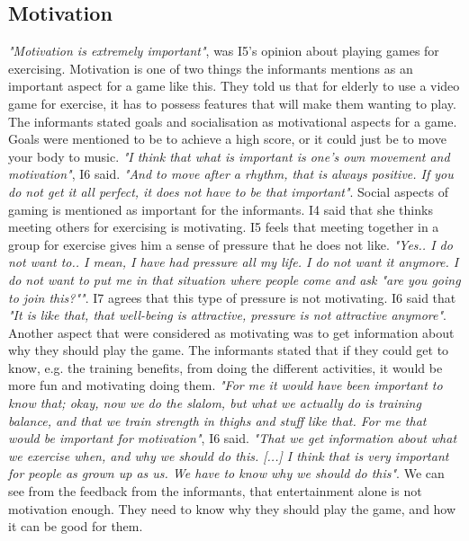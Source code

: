 \subsection{Motivation}
\emph{"Motivation is extremely important"}, was I5's opinion about playing games for exercising. Motivation is one of two things the informants mentions as an important aspect for a game like this. They told us that for elderly to use a video game for exercise, it has to possess features that will make them wanting to play. The informants stated goals and socialisation as motivational aspects for a game. Goals were mentioned to be to achieve a high score, or it could just be to move your body to music. \emph{"I think that what is important is one’s own movement and motivation"}, I6 said. \emph{"And to move after a rhythm, that is always positive. If you do not get it all perfect, it does not have to be that important"}. Social aspects of gaming is mentioned as important for the informants. I4 said that she thinks meeting others for exercising is motivating. I5 feels that meeting together in a group for exercise gives him a sense of pressure that he does not like. \emph{"Yes.. I do not want to.. I mean, I have had pressure all my life. I do not want it anymore. I do not want to put me in that situation where people come and ask "are you going to join this?""}. I7 agrees that this type of pressure is not motivating. I6 said that \emph{"It is like that, that well-being is attractive, pressure is not attractive anymore"}.  Another aspect that were considered as motivating was to get information about why they should play the game. The informants stated that if they could get to know, e.g. the training benefits, from doing the different activities, it would be more fun and motivating doing them. \emph{"For me it would have been important to know that; okay, now we do the slalom, but what we actually do is training balance, and that we train strength in thighs and stuff like that. For me that would be important for motivation"}, I6 said. \emph{"That we get information about what we exercise when, and why we should do this. [...] I think that is very important for people as grown up as us. We have to know why we should do this"}. We can see from the feedback from the informants, that entertainment alone is not motivation enough. They need to know why they should play the game, and how it can be good for them. 

